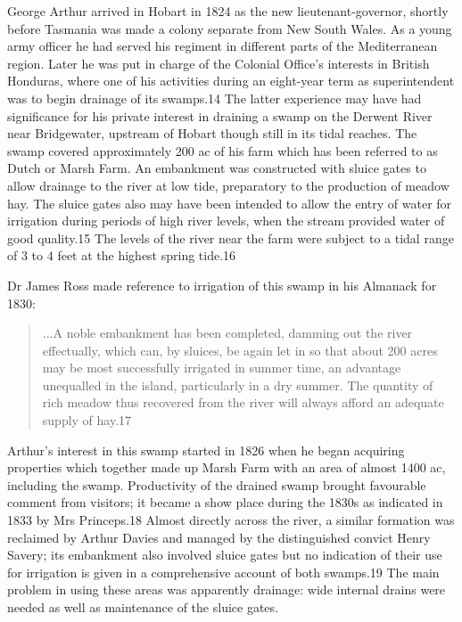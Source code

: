 George Arthur arrived in Hobart in 1824 as the new
lieutenant-governor, shortly before Tasmania was made a colony
separate from New South Wales. As a young army officer he had served
his regiment in different parts of the Mediterranean region. Later he
was put in charge of the Colonial Office's interests in British
Honduras, where one of his activities during an eight-year term as
superintendent was to begin drainage of its swamps.14 The latter
experience may have had significance for his private interest in
draining a swamp on the Derwent River near Bridgewater, upstream of
Hobart though still in its tidal reaches. The swamp covered
approximately 200 ac of his farm which has been referred to as Dutch
or Marsh Farm. An embankment was constructed with sluice gates to
allow drainage to the river at low tide, preparatory to the production
of meadow hay. The sluice gates also may have been intended to allow
the entry of water for irrigation during periods of high river levels,
when the stream provided water of good quality.15 The levels of the
river near the farm were subject to a tidal range of 3 to 4 feet at
the highest spring tide.16

Dr James Ross made reference to irrigation of this swamp in his Almanack for 1830:
\begin{quote}
	...A noble embankment has been completed, damming out the
        river effectually, which can, by sluices, be again let in so
        that about 200 acres may be most successfully irrigated in
        summer time, an advantage unequalled in the island,
        particularly in a dry summer. The quantity of rich meadow thus
        recovered from the river will always afford an adequate supply
        of hay.17
\end{quote}

Arthur's interest in this swamp started in 1826 when he began
acquiring properties which together made up Marsh Farm with an area of
almost 1400 ac, including the swamp. Productivity of the drained swamp
brought favourable comment from visitors; it became a show place
during the 1830s as indicated in 1833 by Mrs Princeps.18 Almost
directly across the river, a similar formation was reclaimed by Arthur
Davies and managed by the distinguished convict Henry Savery; its
embankment also involved sluice gates but no indication of their use
for irrigation is given in a comprehensive account of both swamps.19
The main problem in using these areas was apparently drainage: wide
internal drains were needed as well as maintenance of the sluice
gates.

